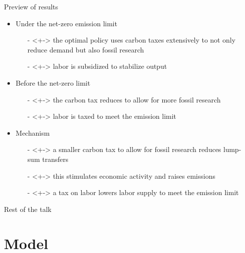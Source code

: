 \documentclass[11pt,aspectratio=169]{beamer}
\begin{document}
\begin{frame}{Preview of results}
	\pause
\begin{itemize}
	
	\item<+-> \alert{Under the net-zero emission limit}
	
	\begin{itemize}
		\item[-]<+->  the optimal policy uses carbon taxes extensively to not only reduce demand but also fossil research
		\item[-]<+->  labor is subsidized to stabilize output
	\end{itemize}
	\vspace{5mm}
	\item<+->  \alert{Before the net-zero limit }
	\begin{itemize}
		\item[-]<+-> the carbon tax reduces to allow for more fossil research
		\item[-]<+-> labor is taxed to meet the emission limit
	\end{itemize}
	\vspace{5mm}
	\item<+-> \alert{Mechanism} 
	\begin{itemize}
		\item[-]<+-> a smaller carbon tax to allow for fossil research reduces lump-sum transfers
		\item[-]<+-> this stimulates economic activity and raises emissions
		\item[-]<+-> a tax on labor lowers labor supply to meet the emission limit  
	\end{itemize}
\end{itemize}
\end{frame}
\begin{frame}{Rest of the talk}
	\tableofcontents
\end{frame}

\section{Model}
\end{document}
